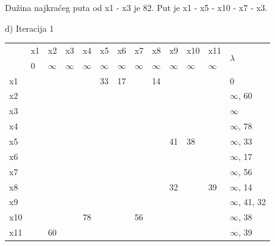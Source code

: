 \documentclass[12pt]{article}
\begin{document}
Dužina najkraćeg puta od x1 - x3 je 82. Put je x1 - x5 - x10 - x7 - x3.

\newpage

d)
Iteracija 1
\begin{table}[hp]
\centering
\begin{tabular}{|l|l|l|l|l|l|l|l|l|l|l|l|l|}
\hline
\multirow{2}{*}{} & x1 & x2 & x3 & x4 & x5 & x6 & x7 & x8 & x9 & x10 & x11 & \multirow{2}{*}{$\lambda$} \\ \cline{2-12}
 & 0 & $\infty$ & $\infty$ & $\infty$ & $\infty$ & $\infty$ & $\infty$ & $\infty$ & $\infty$ & $\infty$ & $\infty$ &  \\ \hline
x1 &  &  &  &  & 33 & 17 &  & 14 &  &  &  & 0 \\ \hline
x2 &  &  &  &  &  &  &  &  &  &  &  & $\infty$, 60 \\ \hline
x3 &  &  &  &  &  &  &  &  &  &  &  & $\infty$ \\ \hline
x4 &  &  &  &  &  &  &  &  &  &  &  & $\infty$, 78 \\ \hline
x5 &  &  &  &  &  &  &  &  & 41 & 38 &  & $\infty$, 33 \\ \hline
x6 &  &  &  &  &  &  &  &  &  &  &  & $\infty$, 17 \\ \hline
x7 &  &  &  &  &  &  &  &  &  &  &  & $\infty$, 56 \\ \hline
x8 &  &  &  &  &  &  &  &  & 32 &  & 39 & $\infty$, 14 \\ \hline
x9 &  &  &  &  &  &  &  &  &  &  &  & $\infty$, 41, 32 \\ \hline
x10 &  &  &  & 78 &  &  & 56 &  &  &  &  & $\infty$, 38 \\ \hline
x11 &  & 60 &  &  &  &  &  &  &  &  &  & $\infty$, 39 \\ \hline
\end{tabular}
\end{table}
\end{document}
